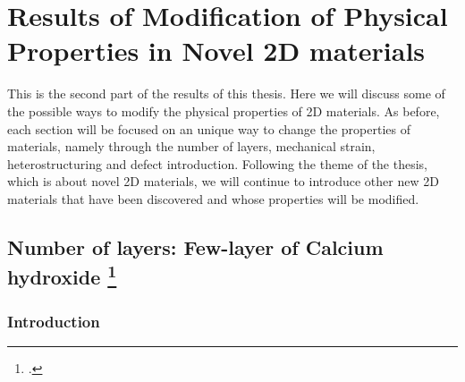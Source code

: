 
\chapter{Results of Modification of Physical Properties in Novel 2D materials \label{chap:5}}

\ifpdf
    \graphicspath{{Chapter5/Figs/Raster/}{Chapter5/Figs/PDF/}{Chapter5/Figs/}{Chapter5/Figs/Vector/}}
\else
    \graphicspath{{Chapter5/Figs/Vector/}{Chapter5/Figs/}}
\fi

This is the second part of the results of this thesis. Here we will discuss some of the possible ways to modify the physical properties of 2D materials. As before, each section will be focused on an unique way to change the properties of materials, namely through the number of layers, mechanical strain, heterostructuring and defect introduction. Following the theme of the thesis, which is about novel 2D materials, we will continue to introduce other new 2D materials that have been discovered and whose properties will be modified. 

\section[Number of layers: Few-layer of Calcium hydroxide]{Number of layers: Few-layer of Calcium hydroxide \footcite[This work is published:][]{Aierken2015.porlandite} \label{CaOH2_layers}}

\subsection{Introduction}

